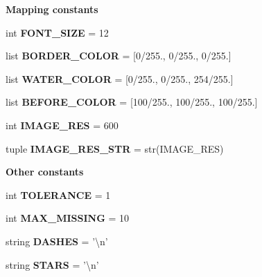 \begin{Indent}{\bf Mapping constants}
\begin{DoxyCompactItemize}
\item 
\hypertarget{namespacebest__track_ad188c3603f85c3e42bc849914104de84}{int {\bfseries F\-O\-N\-T\-\_\-\-S\-I\-Z\-E} = 12}\label{namespacebest__track_ad188c3603f85c3e42bc849914104de84}

\item 
\hypertarget{namespacebest__track_a092e890fa54dd7abaf2c11e376cf7ec0}{list {\bfseries B\-O\-R\-D\-E\-R\-\_\-\-C\-O\-L\-O\-R} = \mbox{[}0/255., 0/255., 0/255.\mbox{]}}\label{namespacebest__track_a092e890fa54dd7abaf2c11e376cf7ec0}

\item 
\hypertarget{namespacebest__track_a99e323d13bfa447eb0f024212ab3013f}{list {\bfseries W\-A\-T\-E\-R\-\_\-\-C\-O\-L\-O\-R} = \mbox{[}0/255., 0/255., 254/255.\mbox{]}}\label{namespacebest__track_a99e323d13bfa447eb0f024212ab3013f}

\item 
\hypertarget{namespacebest__track_a552793d13cba4cf5a2125c079ffd334a}{list {\bfseries B\-E\-F\-O\-R\-E\-\_\-\-C\-O\-L\-O\-R} = \mbox{[}100/255., 100/255., 100/255.\mbox{]}}\label{namespacebest__track_a552793d13cba4cf5a2125c079ffd334a}

\item 
\hypertarget{namespacebest__track_a508c48130a09841d8b15825b80a58266}{int {\bfseries I\-M\-A\-G\-E\-\_\-\-R\-E\-S} = 600}\label{namespacebest__track_a508c48130a09841d8b15825b80a58266}

\item 
\hypertarget{namespacebest__track_af887cb578fdec1d1c68dff15af388285}{tuple {\bfseries I\-M\-A\-G\-E\-\_\-\-R\-E\-S\-\_\-\-S\-T\-R} = str(I\-M\-A\-G\-E\-\_\-\-R\-E\-S)}\label{namespacebest__track_af887cb578fdec1d1c68dff15af388285}

\end{DoxyCompactItemize}
\end{Indent}
\begin{Indent}{\bf Other constants}\par
\begin{DoxyCompactItemize}
\item 
\hypertarget{namespacebest__track_ac1264fc268cf0ee64af8377b5943abc1}{int {\bfseries T\-O\-L\-E\-R\-A\-N\-C\-E} = 1}\label{namespacebest__track_ac1264fc268cf0ee64af8377b5943abc1}

\item 
\hypertarget{namespacebest__track_a9321497741c59370e516a538e4b849d9}{int {\bfseries M\-A\-X\-\_\-\-M\-I\-S\-S\-I\-N\-G} = 10}\label{namespacebest__track_a9321497741c59370e516a538e4b849d9}

\item 
\hypertarget{namespacebest__track_ae59b71997502fb03bb15ed1cfbbb5a61}{string {\bfseries D\-A\-S\-H\-E\-S} = '\textbackslash{}n'}\label{namespacebest__track_ae59b71997502fb03bb15ed1cfbbb5a61}

\item 
\hypertarget{namespacebest__track_ad6c48b7874a76728bb22ce7e06fe2312}{string {\bfseries S\-T\-A\-R\-S} = '\textbackslash{}n'}\label{namespacebest__track_ad6c48b7874a76728bb22ce7e06fe2312}

\end{DoxyCompactItemize}
\end{Indent}
